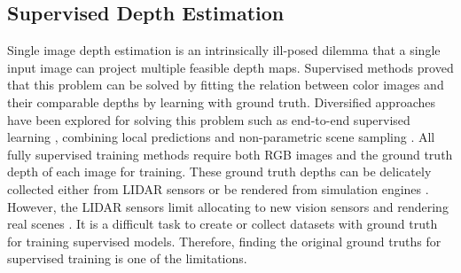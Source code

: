 \documentclass[journal]{IEEEtran}
\begin{document}
\subsection{Supervised Depth Estimation}
Single image depth estimation is an intrinsically ill-posed dilemma that a single input image can project multiple feasible depth maps. Supervised methods proved that this problem can be solved by fitting the relation between color images and their comparable depths by learning with ground truth. Diversified approaches have been explored for solving this problem such as end-to-end supervised learning \cite{Eigen2014,Fu2018}, combining local predictions \cite{Hoiem2005,Saxena2009} and non-parametric scene sampling \cite{Karsch2012}. All fully supervised training methods require both RGB images and the ground truth depth of each image for training. These ground truth depths can be delicately collected either from LIDAR sensors or be rendered from simulation engines \cite{Mayer2016}. However, the LIDAR sensors limit allocating to new vision sensors and rendering real scenes \cite{Shu2020}. It is a difficult task to create or collect datasets with ground truth for training supervised models. Therefore, finding the original ground truths for supervised training is one of the limitations.
\end{document}
